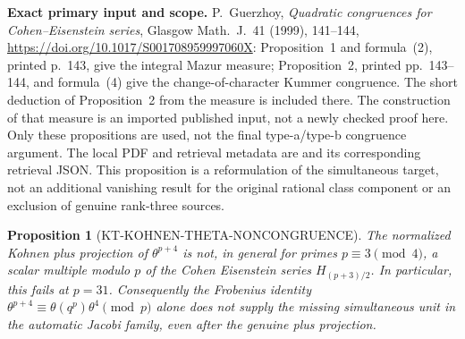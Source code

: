 \documentclass[11pt,a4paper]{article}
\newtheorem{proposition}[theorem]{Proposition}
\theoremstyle{definition}
\renewcommand{\paragraph}[1]{\par\smallskip\noindent\textbf{#1}\quad\ignorespaces}
\begin{document}
\paragraph{Exact primary input and scope.}
P.~Guerzhoy, \emph{Quadratic congruences for Cohen--Eisenstein
series}, Glasgow Math.~J.~41 (1999), 141--144,
\url{https://doi.org/10.1017/S001708959997060X}:
Proposition~1 and formula~(2), printed p.~143, give the integral
Mazur measure; Proposition~2, printed pp.~143--144,
and formula~(4) give the change-of-character Kummer congruence.
The short deduction of Proposition~2 from the measure is included
there.  The construction of that measure is an imported published
input, not a newly checked proof here.  Only these propositions
are used, not the final type-a/type-b congruence argument.
The local PDF and retrieval metadata are
and its corresponding retrieval JSON.
This proposition is a reformulation of the simultaneous target,
not an additional vanishing result for the original rational class
component or an exclusion of genuine rank-three sources.



\begin{proposition}[KT-KOHNEN-THETA-NONCONGRUENCE]
The normalized Kohnen plus projection of $\theta^{p+4}$ is not,
in general for primes $p\equiv3\pmod4$, a scalar multiple modulo $p$ of the Cohen Eisenstein
series $H_{(p+3)/2}$.  In particular, this fails at $p=31$.
Consequently the Frobenius identity
$\theta^{p+4}\equiv\theta(q^p)\theta^4\pmod p$ alone does
not supply the missing simultaneous unit in the automatic Jacobi
family, even after the genuine plus projection.
\end{proposition}
\end{document}
